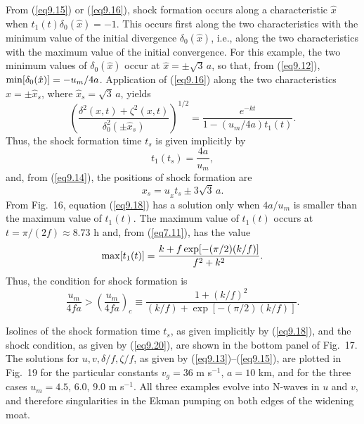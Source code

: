 \documentclass[10pt]{article}
\begin{document}
From (\ref{eq9.15}) or (\ref{eq9.16}), shock formation occurs along a characteristic
$\hat{x}$ when $t_1(t)\delta_0(\hat{x}) = -1$. This occurs first along the two characteristics
with the minimum value of the initial divergence $\delta_0(\hat{x})$, i.e., along the
two characteristics with the maximum value of the initial convergence. For this example,
the two minimum values of $\delta_0(\hat{x})$ occur at $\hat{x}=\pm\sqrt{3}\, a$, so that,
from (\ref{eq9.12}), ${\rm min}[\delta_0(\hat{x})] = -u_m/4a$. Application of (\ref{eq9.16})
along the two characteristics $\hat{x}=\pm\hat{x}_s$, where $\hat{x}_s=\sqrt{3}\, a$, yields
\begin{equation}                                    %
        \left(\frac{\delta^2(x,t) + \zeta^2(x,t)}{\delta_0^2(\pm\hat{x}_s)}\right)^{1/2}
     = \frac{e^{-kt}}{1 - (u_m/4a)t_1(t)}.
\label{eq9.17}
\end{equation}
Thus, the shock formation time $t_s$ is given implicitly by
\begin{equation}                                  %
          t_1(t_s) = \frac{4a}{u_m},
\label{eq9.18}
\end{equation}
and, from (\ref{eq9.14}), the positions of shock formation are
\begin{equation}                                  %
            x_s = u_{_E} t_s \pm 3\sqrt{3}\, a.
\label{eq9.19}
\end{equation}
From Fig.~16, equation (\ref{eq9.18}) has a solution only when $4a/u_m$
is smaller than the maximum value of $t_1(t)$. The maximum value of $t_1(t)$
occurs at $t=\pi/(2f)\approx 8.73$ h and, from (\ref{eq7.11}), has the value
   $$  {\rm max}[t_1(t)] = \frac{k+f\exp[-(\pi/2)(k/f)]}{f^2+k^2}.   $$
Thus, the condition for shock formation is
\begin{equation}                                  %
       \frac{u_m}{4fa} > \left(\frac{u_m}{4fa}\right)_c
       \equiv \frac{1 + (k/f)^2}{(k/f) + \exp[-(\pi/2)(k/f)]}.
\label{eq9.20}
\end{equation}

     Isolines of the shock formation time $t_s$, as given implicitly by
(\ref{eq9.18}), and the shock condition, as given by (\ref{eq9.20}), are
shown in the bottom panel of Fig.~17.  The solutions for $u,v,\delta/f,\zeta/f$,
as given by (\ref{eq9.13})--(\ref{eq9.15}), are plotted in Fig.~19
for the particular constants $v_g=36$ m s$^{-1}$, $a=10$ km, and for
the three cases $u_m=4.5,\, 6.0,\, 9.0$ m s$^{-1}$. All three examples
evolve into N-waves in $u$ and $v$, and therefore singularities in the
Ekman pumping on both edges of the widening moat.
\end{document}
